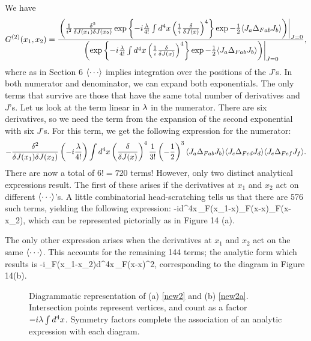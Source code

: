 \documentclass[12pt]{article}
\begin{document}
We have
\[
G^{(2)}(x_1,x_2)={
  \left.\left({1\over i^2}{\delta^2\over\delta J(x_1)\delta J(x_2)}
  \exp\left\{{-i{\lambda\over4!}\int d^4x
  \left({1\over i}{\delta\over\delta J(x)}\right)^4}\right\}
  \exp{-{\frac 12}{\left\langle{J_a\Delta_{Fab}J_b}\right\rangle}}
  \right)\right|_{J=0}
\over
  \left.\left(\exp\left\{{-i{\lambda\over4!}\int d^4x
  \left({1\over i}{\delta\over\delta J(x)}\right)^4}\right\}
  \exp{-{\frac 12}{\left\langle{J_a\Delta_{Fab}J_b}\right\rangle}}
  \right)\right|_{J=0}
},
\]
where as in Section 6
${\left\langle{\cdots}\right\rangle}$ implies integration over the positions of
the $J$'s. In both numerator and denominator, we can expand both
exponentials. The only terms that survive are those that have the same
total number of derivatives and $J$'s. Let us look at the term linear
in $\lambda$ in the numerator. There are six derivatives, so we need the
term from the expansion of the second exponential with six $J$'s. For
this term, we get the following expression for the numerator:
\[
-{\delta^2\over\delta J(x_1)\delta J(x_2)}\left(-i{\lambda\over4!}\right)
\int d^4x\left({\delta\over\delta J(x)}\right)^4
{1\over3!}\left(-{\frac 12}\right)^3
{\left\langle{J_a\Delta_{Fab}J_b}\right\rangle}{\left\langle{J_c\Delta_{Fcd}J_d}\right\rangle}
{\left\langle{J_e\Delta_{Fef}J_f}\right\rangle}.
\]
There are now a total of $6!=720$ terms! However, only two distinct
analytical expressions result. The first of these
arises if the derivatives at $x_1$ and $x_2$ act on different
${\left\langle{\cdots}\right\rangle}$'s. A little combinatorial head-scratching tells us that
there are 576 such terms, yielding the following expression:
\beq
-{i\la{}}\int d^4x\,\Delta_F(x_1-x)\Delta_F(x-x)\Delta_F(x-x_2),
\label{new2}
\eeq
which can be represented pictorially as in Figure 14 (a).

The only other expression arises when
the derivatives at $x_1$ and $x_2$ act on the same
${\left\langle{\cdots}\right\rangle}$. This accounts for the remaining 144 terms; the analytic
form which results is
\beq
-{i\la{}}\Delta_F(x_1-x_2)\int d^4x\,\Delta_F(x-x)^2,
\label{new2a}
\eeq
corresponding to the diagram in Figure 14(b).

\begin{figure}[ht]
\epsfysize=3cm
\centerline{}
\caption{Diagrammatic representation of (a) \eqref{new2} and (b)
  \eqref{new2a}. Intersection points represent vertices, and count as
  a factor $-i\lambda\int d^4x$. Symmetry factors complete the
  association of an analytic expression with each diagram.}
\end{figure}
\end{document}
